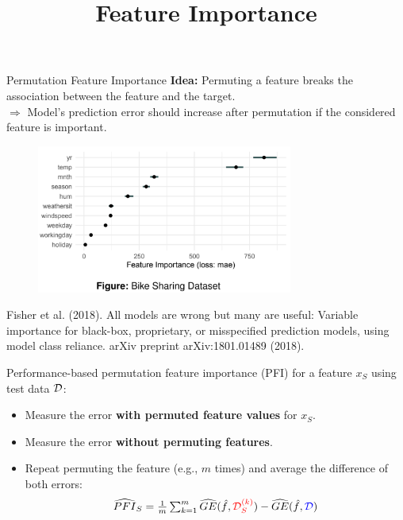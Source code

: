 \documentclass[11pt,compress,t,notes=noshow, xcolor=table]{beamer}
\title{Feature Importance}
\institute{\href{https://compstat-lmu.github.io/lecture_i2ml/}{compstat-lmu.github.io/lecture\_i2ml}}
\date{}
\begin{document}
	
	
	
	
	
	
	
	
	

\begin{vbframe}{Permutation Feature Importance}
\textbf{Idea:} Permuting a feature breaks the association between the feature and the target.\\
$\Rightarrow$ Model's prediction error should increase after permutation if the considered feature is important.

\begin{figure}
  \includegraphics[width=0.75\textwidth]{figure_man/feature-importance.png}
\end{figure}

\vspace{-0.2cm}
\tiny{Fisher et al. (2018). All models are wrong but many are useful: Variable importance for black-box, proprietary, or misspecified prediction models, using model class reliance. arXiv preprint arXiv:1801.01489 (2018).}

\framebreak
\normalsize

Performance-based permutation feature importance (PFI) for a feature $x_S$ using test data $\D$:
\begin{itemize}
  \item Measure the error \color{red}\textbf{with permuted feature values} \color{black} for $x_S$.
  \item Measure the error \color{blue}\textbf{without permuting features}\color{black}.
  \item Repeat permuting the feature (e.g., $m$ times) and average the difference of both errors: 
$$\widehat{PFI}_S = \tfrac{1}{m} \textstyle\sum\nolimits_{k = 1}^{m} \widehat{GE}(\fh, {\color{red}\D_{S}^{(k)}}) - \widehat{GE}(\fh, {\color{blue}\D})$$
\end{itemize}


\end{vbframe}
\end{document}
